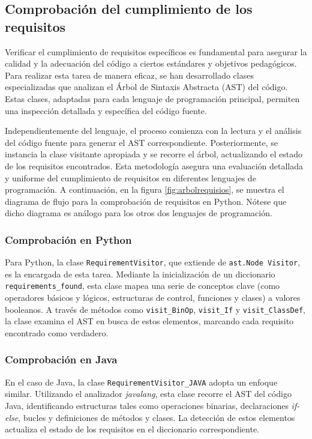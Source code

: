\subsection{Comprobación del cumplimiento de los requisitos}

Verificar el cumplimiento de requisitos específicos es fundamental para asegurar la calidad y la adecuación del código a ciertos estándares y objetivos pedagógicos. Para realizar esta tarea de manera eficaz, se han desarrollado clases especializadas que analizan el Árbol de Sintaxis Abstracta (AST) \cite{astlibrary} del código. Estas clases, adaptadas para cada lenguaje de programación principal, permiten una inspección detallada y específica del código fuente.

Independientemente del lenguaje, el proceso comienza con la lectura y el análisis del código fuente para generar el AST correspondiente. Posteriormente, se instancia la clase visitante apropiada y se recorre el árbol, actualizando el estado de los requisitos encontrados. Esta metodología asegura una evaluación detallada y uniforme del cumplimiento de requisitos en diferentes lenguajes de programación. A continuación, en la figura \ref{fig:arbolrequisios}, se muestra el diagrama de flujo para la comprobación de requisitos en Python. Nótese que dicho diagrama es análogo para los otros dos lenguajes de programación.

\subsubsection*{Comprobación en Python}

Para Python, la clase \texttt{RequirementVisitor}, que extiende de \texttt{ast.Node Visitor}, es la encargada de esta tarea. Mediante la inicialización de un diccionario \texttt{requirements\_found}, esta clase mapea una serie de conceptos clave (como operadores básicos y lógicos, estructuras de control, funciones y clases) a valores booleanos. A través de métodos como \texttt{visit\_BinOp}, \texttt{visit\_If} y \texttt{visit\_ClassDef}, la clase examina el AST en busca de estos elementos, marcando cada requisito encontrado como verdadero.

\subsubsection*{Comprobación en Java}

En el caso de Java, la clase \texttt{RequirementVisitor\_JAVA} adopta un enfoque similar. Utilizando el analizador \textit{javalang}, esta clase recorre el AST del código Java, identificando estructuras tales como operaciones binarias, declaraciones \textit{if-else}, bucles y definiciones de métodos y clases. La detección de estos elementos actualiza el estado de los requisitos en el diccionario correspondiente.

